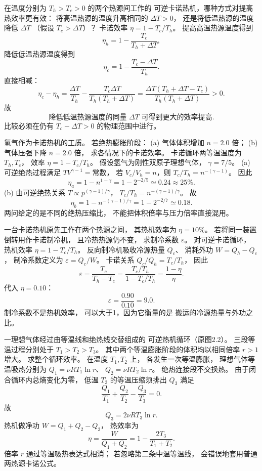 在温度分别为 $T_h>T_c>0$ 的两个热源间工作的
可逆卡诺热机，哪种方式对提高热效率更有效：
将高温热源的温度升高相同的
$\Delta T>0$，
还是将低温热源的温度降低 $\Delta T$
（假设 $T_c>\Delta T$）？
\exsolution
卡诺效率
$\eta=1-T_c/T_h$。
提高高温热源温度得到
\[
\eta_h=1-\frac{T_c}{T_h+\Delta T},
\]
降低低温热源温度得到
\[
\eta_c=1-\frac{T_c-\Delta T}{T_h}.
\]
直接相减：
\[
\eta_c-\eta_h
=\frac{\Delta T}{T_h}
-\frac{T_c\Delta T}{T_h(T_h+\Delta T)}
=\frac{\Delta T(T_h+\Delta T-T_c)}
{T_h(T_h+\Delta T)}>0.
\]
故
\[
\boxed{\text{降低低温热源温度的同量 }\Delta T
\text{ 可得到更大的效率提高}}.
\]
\excheck 比较必须在仍有
$T_c-\Delta T>0$ 的物理范围中进行。

氢气作为卡诺热机的工质。
若绝热膨胀阶段：
(a) 气体体积增加 $n=2.0$ 倍；
(b) 气体压强下降 $n=2.0$ 倍，
求各情况下的卡诺效率。
\exsolution
卡诺循环两等温温度为 $T_h,T_c$，
效率
$\eta=1-T_c/T_h$。
假设氢气为刚性双原子理想气体，
$\gamma=7/5$。
(a) 可逆绝热过程满足
$TV^{\gamma-1}=\text{常数}$，
若 $V_c/V_h=n$，则
$T_c/T_h=n^{-(\gamma-1)}$。
因此
\[
\boxed{\eta_a=1-n^{1-\gamma}
=1-2^{-2/5}\simeq0.24\approx25\%}.
\]
(b) 由可逆绝热关系
$T\propto p^{(\gamma-1)/\gamma}$，
$T_c/T_h=n^{-(\gamma-1)/\gamma}$。
故
\[
\boxed{\eta_b=1-n^{-(\gamma-1)/\gamma}
=1-2^{-2/7}\simeq0.18}.
\]
\excheck 两问给定的是不同的绝热压缩比，
不能把体积倍率与压力倍率直接混用。

一台卡诺热机原先工作在两个热源之间，
其热机效率为 $\eta=10\%$。
若将同一装置倒转用作卡诺制冷机，
且冷热热源仍不变，
求制冷系数 $\varepsilon$。
\exsolution
对可逆卡诺循环，
热机效率
$\eta=1-T_c/T_h$。
反向制冷机吸收冷源热量 $Q_c$、
消耗外功 $W=Q_h-Q_c$，
制冷系数定义为
$\varepsilon=Q_c/W$。
卡诺关系
$Q_c/Q_h=T_c/T_h$，
因此
\[
\varepsilon=\frac{T_c}{T_h-T_c}
=\frac{T_c/T_h}{1-T_c/T_h}
=\frac{1-\eta}{\eta}.
\]
代入 $\eta=0.10$：
\[
\boxed{\varepsilon=\frac{0.90}{0.10}=9.0}.
\]
\excheck 制冷系数不是热机效率，
可以大于1，因为它衡量的是
搬运的冷源热量与外功之比。

一理想气体经过由等温线和绝热线交替组成的
可逆热机循环（原图2.2）。
三段等温过程分别处于
$T_1>T_2>T_3$。
其中两个等温膨胀阶段的体积均以相同倍率
$r>1$ 增大。
求整个循环效率。
\exsolution
在温度 $T_1,T_2$ 上，
各发生一次等温膨胀，
理想气体等温吸热分别为
$Q_1=\nu RT_1\ln r$、
$Q_2=\nu RT_2\ln r$。
绝热连接段不交换热。
由于闭合循环内总熵变化为零，
低温 $T_3$ 的等温压缩须排出
$Q_3$ 满足
\[
\frac{Q_1}{T_1}+\frac{Q_2}{T_2}
-\frac{Q_3}{T_3}=0.
\]
故
\[
Q_3=2\nu RT_3\ln r.
\]
热机做净功
$W=Q_1+Q_2-Q_3$，
热效率为
\[
\boxed{\eta=\frac{W}{Q_1+Q_2}
=1-\frac{2T_3}{T_1+T_2}}.
\]
\excheck 倍率 $r$ 通过等温吸热表达式相消；
若忽略第二条中温等温线，
会错误地套用普通两热源卡诺公式。

